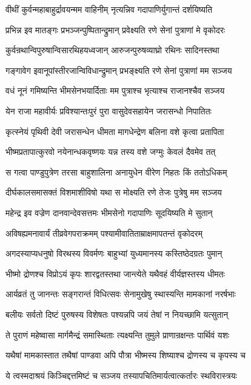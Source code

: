 \twolineshloka
{वीथीं कुर्वन्महाबाहुर्द्रावयन्मम वाहिनीम्}
{नृत्यन्निव गदापाणिर्युगान्तं दर्शयिष्यति}


\twolineshloka
{प्रभिन्न इव मातङ्गः प्रभञ्जन्पुष्पितान्द्रुमान्}
{प्रवेक्ष्यति रणे सेनां पुत्राणां मे वृकोदरः}


\twolineshloka
{कुर्वन्रथान्विपुरुषान्विसारथिहयध्वजान्}
{आरुजन्पुरुषव्याघ्रो रथिनः सादिनस्तथा}


\twolineshloka
{गङ्गावेग इवानूपांस्तीरजान्विविधान्द्रुमान्}
{प्रभङ्क्ष्यति रणे सेनां पुत्राणां मम सञ्जय}


\twolineshloka
{वधं नूनं गमिष्यन्ति भीमसेनभयार्दिताः}
{मम पुत्राश्च भृत्याश्च राजानश्चैव सञ्जय}


\twolineshloka
{येन राजा महावीर्यः प्रविश्यान्तःपुरं पुरा}
{वासुदेवसहायेन जरासन्धो निपातितः}


\twolineshloka
{कृत्स्नेयं पृथिवी देवी जरासन्धेन धीमता}
{मागधेन्द्रेण बलिना वशे कृत्वा प्रतापिता}


\twolineshloka
{भीष्मप्रतापात्कुरवो नयेनान्धकवृष्णयः}
{यन्न तस्य वशे जग्मुः केवलं दैवमेव तत्}


\twolineshloka
{स गत्वा पाण्डुपुत्रेण तरसा बाहुशालिना}
{अनायुधेन वीरेण निहतः किं ततोऽधिकम्}


\twolineshloka
{दीर्घकालसमासक्तं विशमाशीविषो यथा}
{स मोक्ष्यति रणे तेजः पुत्रेषु मम सञ्जय}


\twolineshloka
{महेन्द्र इव वज्रेण दानवान्देवसत्तमः}
{भीमसेनो गदापाणिः सूदयिष्यति मे सुतान्}


\twolineshloka
{अविषह्यमनावार्यं तीव्रवेगपराक्रमम्}
{पश्यामीवातिताम्राक्षमापतन्तं वृकोदरम्}


\twolineshloka
{अगदस्याप्यधनुषो विरथस्य विवर्मणः}
{बाहुभ्यां युध्यमानस्य कस्तिष्ठेदग्रतः पुमान्}


\twolineshloka
{भीष्मो द्रोणश्च विप्रोऽयं कृपः शारद्वतस्तथा}
{जान्त्येते यथैवहं वीर्यज्ञस्तस्य धीमतः}


\twolineshloka
{आर्यव्रतं तु जानन्तः सङ्गरान्तं विधित्सवः}
{सेनामुखेषु स्थास्यन्ति मामकानां नरर्षभाः}


\twolineshloka
{बलीयः सर्वतो दिष्टं पुरुषस्य विशेषतः}
{पश्यन्नपि जयं तेषां न नियच्छामि यत्सुतान्}


\twolineshloka
{ते पुराणं महेष्वासा मार्गमैन्द्रं समास्थिताः}
{त्यक्ष्यन्ति तुमुले प्राणान्रक्षन्तः पार्थिवं यशः}


\twolineshloka
{यथैषां मामकास्तात तथैषां पाण्डवा अपि}
{पौत्रा भीष्मस्य शिष्याश्च द्रोणस्य च कृपस्य च}


\twolineshloka
{ये त्वस्मदाश्रयं किञ्चिद्दत्तमिष्टं च सञ्जय}
{तस्यापचितिमार्यत्वात्कर्तारः स्थविरास्त्रयः}


